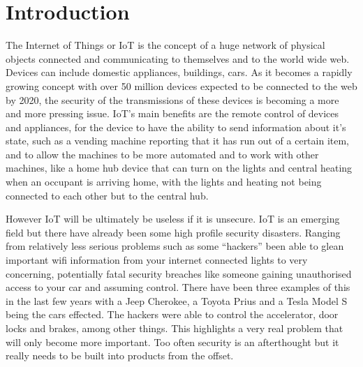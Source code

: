 
\chapter{Introduction}
\label{intro}


\newcommand{\keyword}[1]{\textbf{#1}}
\newcommand{\tabhead}[1]{\textbf{#1}}
\newcommand{\code}[1]{\texttt{#1}}
\newcommand{\file}[1]{\texttt{\bfseries#1}}
\newcommand{\option}[1]{\texttt{\itshape#1}}


The Internet of Things or IoT is the concept of a huge network of physical objects connected and communicating to themselves and to the world wide web.
Devices can include domestic appliances, buildings, cars. As it becomes a rapidly growing concept with over 50 million devices expected to be connected to the web by 2020\cite{50milby2020}, the security of the transmissions of these devices is becoming a more and more pressing issue. IoT's main benefits are the remote control of devices and appliances, for the device to have the ability to send information about it's state, such as a vending machine reporting that it has run out of a certain item, and to allow the machines to be more automated and to work with other machines, like a home hub device that can turn on the lights and central heating when an occupant is arriving home, with the lights and heating not being connected to each other but to the central hub.
	
	However IoT will be ultimately be useless if it is unsecure. IoT is an emerging field but there have already been some high profile security disasters. Ranging from relatively less serious problems such as some ``hackers''  been able to glean important wifi information from your internet connected lights \cite{hackingsum} to very concerning, potentially fatal security breaches like someone gaining unauthorised access to your car and assuming control. There have been three examples of this in the last few years with a Jeep Cherokee\cite{jeephack}, a Toyota Prius\cite{priushack} and a Tesla Model S\cite{teslahack} being the cars effected. The hackers were able to control the accelerator, door locks and brakes, among other things. This highlights a very real problem that will only become more important. Too often security is an afterthought but it really needs to be built into products from the offset.

